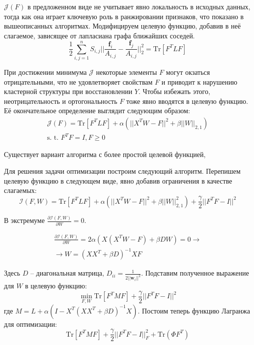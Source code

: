 $\mathcal{J}(F)$ в предложенном виде не учитывает явно локальность в исходных данных, тогда как она играет ключевую роль в ранжировании признаков, что показано в вышеописанных алгоритмах. Модифицируем целевую функцию, добавив в неё слагаемое, зависящее от лапласиана графа ближайших соседей. 
\begin{equation}
	\frac12 \sum_{i,j=1}^n S_{i,j} ||\frac{\mathbf{f}_i}{A_{i,j}}  - \frac{\mathbf{f}_j}{A_{i,j}}||^2_2 = \text{Tr}[F^T L F]
\end{equation}

При достижении минимума $\mathcal{J}$ некоторые элементы $F$ могут окзаться отрицательными, что не удовлетворяет свойствам $F$  и приводит к нарушению кластерной структуры при восстановлении $Y$. Чтобы избежать этого, неотрицательность и ортогональность $F$ тоже явно вводятся в целевую функцию. Её окончательное определение выглядит следующим образом:
\begin{equation}
	\begin{array}{r}
		\mathcal{J}(F) = \text{Tr}[F^T L F] + \alpha(||X^T W - F||^2 + \beta||W||_{2,1}) \\
		\text{s. t. } F^T F = I, F \geq 0
	\end{array}
\end{equation}

Существует вариант алгоритма с более простой целевой функцией\cite{li2012unsupervised}, 

Для решения задачи оптимизации построим следующий алгоритм. Перепишем целевую функцию в следующем виде, явно добавив ограничения в качестве слагаемых:
\begin{equation}
	\mathcal{I}(F, W) = \text{Tr}[F^T L F] + \alpha(||X^T W - F||^2 + \beta ||W||^2_{2,1}) + \frac{\gamma}{2} ||F^T F - I||^2
\end{equation}

В экстремуме $\frac{ \partial\mathcal{I}(F, W)}{\partial W} = 0$.

\begin{equation}
	\begin{array}{r}
	\frac{\partial{\mathcal{I}(F, W)}}{\partial{W}} = 2 \alpha (X (X^T W - F) + \beta D W) = 0 \rightarrow \\
\rightarrow W = (XX^T + \beta D)^{-1} X F
	\end{array} 
\end{equation}

Здесь $D$ -- диагональная матрица, $D_{ii} = \frac{1}{2 ||\mathbf{w}_i||^2}$. Подставим полученное выражение для $W$ в целевую функцию:
\begin{equation}
	\min_{F, W} \text{Tr} [F^T M F ] + \frac{\gamma}2||F^T F - I||^2
\end{equation}
где $M=L + \alpha(I - X^T(X X^T + \beta D)^{-1} X)$. Постоим теперь функцию Лагранжа для оптимизации:
\begin{equation}
	\text{Tr}[F^T M F] + \frac\gamma2||F^T F - I||^2_F + \text{Tr}(\Phi F^T)
\end{equation}

